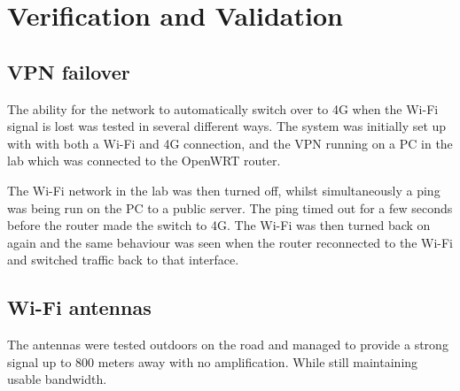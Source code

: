 \section{Verification and Validation}

\subsection{VPN failover}
The ability for the network to automatically switch over to 4G when the Wi-Fi signal is lost was tested in several different ways.
\newline
The system was initially set up with with both a Wi-Fi and 4G connection, and the VPN running on a PC in the lab which was connected to the OpenWRT router.

The Wi-Fi network in the lab was then turned off, whilst simultaneously a ping was being run on the PC to a public server. The ping timed out for a few seconds before the router made the switch to 4G. The Wi-Fi was then turned back on again and the same behaviour was seen when the router reconnected to the Wi-Fi and switched traffic back to that interface.

\subsection{Wi-Fi antennas}
The antennas were tested outdoors on the road and managed to provide a strong signal up to 800 meters away with no amplification. While still maintaining usable bandwidth.
